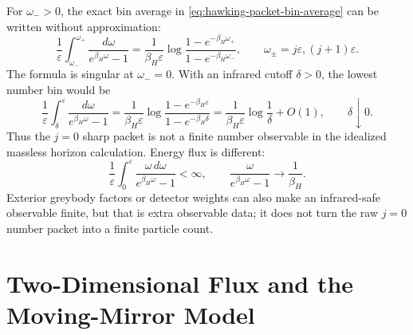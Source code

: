 For \(\omega_->0\), the exact bin average in
\eqref{eq:hawking-packet-bin-average} can be written without approximation:
\[
  \frac1{\varepsilon}
  \int_{\omega_-}^{\omega_+}
  \frac{d\omega}{e^{\beta_H\omega}-1}
  =
  \frac{1}{\beta_H\varepsilon}
  \log
  \frac{1-e^{-\beta_H\omega_+}}
       {1-e^{-\beta_H\omega_-}},
  \qquad
  \omega_\pm=j\varepsilon,(j+1)\varepsilon .
\]
The formula is singular at \(\omega_-=0\).  With an infrared cutoff
\(\delta>0\), the lowest number bin would be
\begin{equation}
  \frac1{\varepsilon}
  \int_\delta^\varepsilon
  \frac{d\omega}{e^{\beta_H\omega}-1}
  =
  \frac{1}{\beta_H\varepsilon}
  \log
  \frac{1-e^{-\beta_H\varepsilon}}
       {1-e^{-\beta_H\delta}}
  =
  \frac{1}{\beta_H\varepsilon}\log\frac1\delta+O(1),
  \qquad \delta\downarrow0 .
  \label{eq:hawking-low-bin-number-divergence}
\end{equation}
Thus the \(j=0\) sharp packet is not a finite number observable in the
idealized massless horizon calculation.  Energy flux is different:
\begin{equation}
  \frac1{\varepsilon}
  \int_0^\varepsilon
  \frac{\omega\,d\omega}{e^{\beta_H\omega}-1}
  <\infty,
  \qquad
  \frac{\omega}{e^{\beta_H\omega}-1}\longrightarrow \frac1{\beta_H}.
  \label{eq:hawking-low-bin-energy-finite}
\end{equation}
Exterior greybody factors or detector weights can also make an
infrared-safe observable finite, but that is extra observable data; it does
not turn the raw \(j=0\) number packet into a finite particle count.

\section{Two-Dimensional Flux and the Moving-Mirror Model}

